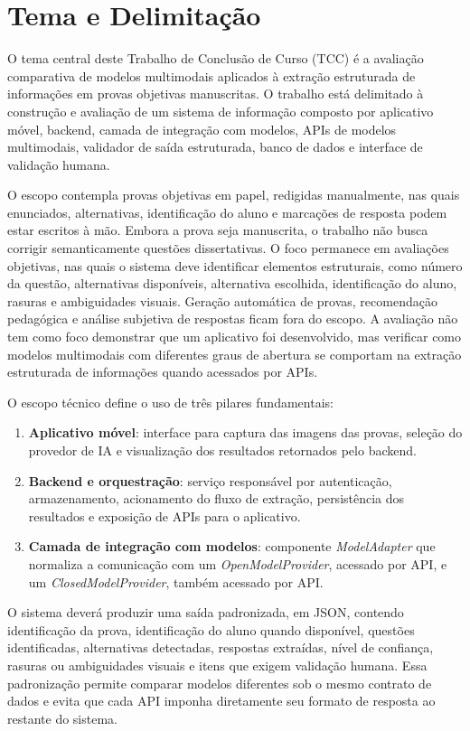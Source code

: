 \section{Tema e Delimitação}\label{tema}

O tema central deste Trabalho de Conclusão de Curso (TCC) é a avaliação comparativa de modelos multimodais aplicados à extração estruturada de informações em provas objetivas manuscritas. O trabalho está delimitado à construção e avaliação de um sistema de informação composto por aplicativo móvel, backend, camada de integração com modelos, APIs de modelos multimodais, validador de saída estruturada, banco de dados e interface de validação humana.

O escopo contempla provas objetivas em papel, redigidas manualmente, nas quais enunciados, alternativas, identificação do aluno e marcações de resposta podem estar escritos à mão. Embora a prova seja manuscrita, o trabalho não busca corrigir semanticamente questões dissertativas. O foco permanece em avaliações objetivas, nas quais o sistema deve identificar elementos estruturais, como número da questão, alternativas disponíveis, alternativa escolhida, identificação do aluno, rasuras e ambiguidades visuais. Geração automática de provas, recomendação pedagógica e análise subjetiva de respostas ficam fora do escopo. A avaliação não tem como foco demonstrar que um aplicativo foi desenvolvido, mas verificar como modelos multimodais com diferentes graus de abertura se comportam na extração estruturada de informações quando acessados por APIs.

O escopo técnico define o uso de três pilares fundamentais:

\begin{enumerate}
    \item \textbf{Aplicativo móvel}: interface para captura das imagens das provas, seleção do provedor de IA e visualização dos resultados retornados pelo backend.
    \item \textbf{Backend e orquestração}: serviço responsável por autenticação, armazenamento, acionamento do fluxo de extração, persistência dos resultados e exposição de APIs para o aplicativo.
    \item \textbf{Camada de integração com modelos}: componente \textit{ModelAdapter} que normaliza a comunicação com um \textit{OpenModelProvider}, acessado por API, e um \textit{ClosedModelProvider}, também acessado por API.
\end{enumerate}

O sistema deverá produzir uma saída padronizada, em JSON, contendo identificação da prova, identificação do aluno quando disponível, questões identificadas, alternativas detectadas, respostas extraídas, nível de confiança, rasuras ou ambiguidades visuais e itens que exigem validação humana. Essa padronização permite comparar modelos diferentes sob o mesmo contrato de dados e evita que cada API imponha diretamente seu formato de resposta ao restante do sistema.

